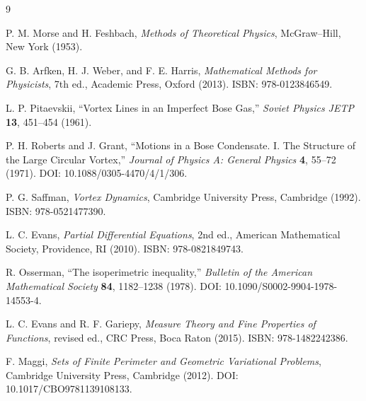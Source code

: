 \documentclass[11pt]{article}
\begin{document}
\begin{thebibliography}{9}

P. M. Morse and H. Feshbach,
\emph{Methods of Theoretical Physics},
McGraw--Hill, New York (1953).

G. B. Arfken, H. J. Weber, and F. E. Harris,
\emph{Mathematical Methods for Physicists}, 7th ed.,
Academic Press, Oxford (2013).
ISBN: 978-0123846549.

L. P. Pitaevskii,
``Vortex Lines in an Imperfect Bose Gas,''
\emph{Soviet Physics JETP} \textbf{13}, 451--454 (1961).

P. H. Roberts and J. Grant,
``Motions in a Bose Condensate. I. The Structure of the Large Circular Vortex,''
\emph{Journal of Physics A: General Physics} \textbf{4}, 55--72 (1971).
DOI: 10.1088/0305-4470/4/1/306.

P. G. Saffman,
\emph{Vortex Dynamics},
Cambridge University Press, Cambridge (1992).
ISBN: 978-0521477390.

L. C. Evans,
\emph{Partial Differential Equations}, 2nd ed.,
American Mathematical Society, Providence, RI (2010).
ISBN: 978-0821849743.

R. Osserman,
``The isoperimetric inequality,''
\emph{Bulletin of the American Mathematical Society} \textbf{84},
1182--1238 (1978).
DOI: 10.1090/S0002-9904-1978-14553-4.

L. C. Evans and R. F. Gariepy,
\emph{Measure Theory and Fine Properties of Functions},
revised ed.,
CRC Press, Boca Raton (2015).
ISBN: 978-1482242386.

F. Maggi,
\emph{Sets of Finite Perimeter and Geometric Variational Problems},
Cambridge University Press, Cambridge (2012).
DOI: 10.1017/CBO9781139108133.

\end{thebibliography}
\end{document}
